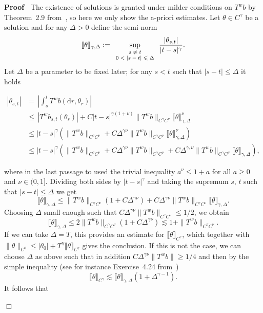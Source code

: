 \documentclass[10pt]{article}
\newcommand{\assign}{:=}
\newcommand{\mathd}{\mathrm{d}}
\newcommand{\tmscript}[1]{\text{\scriptsize{$#1$}}}
\newenvironment{proof}{\noindent\textbf{Proof\ }}{\hspace*{\fill}$\Box$\medskip}
\begin{document}
\begin{proof}
  The existence of solutions is granted under milder conditions on $T^w b$ by
  Theorem~2.9 from~{\cite{catelliergubinelli}}, so here we only show the
  a-priori estimates. Let $\theta \in C^{\gamma}$ be a solution and for any
  $\Delta > 0$ define the semi-norm
  \[ \llbracket \theta \rrbracket_{\gamma, \Delta} \assign
     \sup_{\tmscript{\begin{array}{c}
       s \neq t\\
       0 < | s - t | \leqslant \Delta
     \end{array}}} \frac{| \theta_{s, t} |}{| t - s |^{\gamma}} . \]
  Let $\Delta$ be a parameter to be fixed later; for any $s < t$ such that $|
  s - t | \leqslant \Delta$ it holds
  
  \begin{align*}
    | \theta_{s, t} | & = \, \left| \int_s^t T^w b (\mathd r, \theta_r)
    \right|\\
    & \leqslant \, | T^w b_{s, t} (\theta_s) | + C | t - s |^{\gamma (1 +
    \nu)}  \| T^w b \|_{C^{\gamma} C^{\nu}}  \llbracket \theta
    \rrbracket^{\nu}_{\gamma, \Delta}\\
    & \leqslant | t - s |^{\gamma}  (\| T^w b \|_{C^{\gamma} C^{\nu}} + C
    \Delta^{\gamma \nu} \| T^w b \|_{C^{\gamma} C^{\nu}}  \llbracket \theta
    \rrbracket^{\nu}_{\gamma, \Delta})\\
    & \leqslant | t - s |^{\gamma} (\| T^w b \|_{C^{\gamma} C^{\nu}} + C
    \Delta^{\gamma \nu} \| T^w b \|_{C^{\gamma} C^{\nu}} + C
    \Delta^{\gamma, \nu} \| T^w b \|_{C^{\gamma} C^{\nu}} \llbracket \theta
    \rrbracket_{\gamma, \Delta}),
  \end{align*}
  
  where in the last passage to used the trivial inequality $a^{\nu} \leqslant
  1 + a$ for all $a \geqslant 0$ and $\nu \in (0, 1]$. Dividing both sides by
  $| t - s |^{\gamma}$ and taking the supremum $s$, $t$ such that $| s - t |
  \leqslant \Delta$ we get
  \[ \llbracket \theta \rrbracket_{\gamma, \Delta} \leqslant \| T^w b
     \|_{C^{\gamma} C^{\nu}}  (1 + C \Delta^{\gamma \nu}) + C \Delta^{\gamma
     \nu} \| T^w b \|_{C^{\gamma} C^{\nu}} \llbracket \theta
     \rrbracket_{\gamma, \Delta} . \]
  Choosing $\Delta$ small enough such that $C \Delta^{\gamma \nu} \| T^w b
  \|_{C^{\gamma} C^{\nu}} \leqslant 1 / 2$, we obtain
  \[ \llbracket \theta \rrbracket_{\gamma, \Delta} \leqslant 2 \| T^w b
     \|_{C^{\gamma} C^{\nu}}  (1 + C \Delta^{\gamma \nu}) \lesssim 1 + \| T^w
     b \|_{C^{\gamma} C^{\nu}} . \]
  If we can take $\Delta = T$, this provides an estimate for $\llbracket
  \theta \rrbracket_{C^{\gamma}}$, which together with $\| \theta \|_{C^0}
  \leqslant | \theta_0 | + T^{\gamma} \llbracket \theta
  \rrbracket_{C^{\gamma}}$ gives the conclusion. If this is not the case, we
  can choose $\Delta$ as above such that in addition $C \Delta^{\gamma \nu} \|
  T^w b \| \geqslant 1 / 4$ and then by the simple inequality (see for
  instance Exercise~4.24 from~{\cite{frizhairer}})
  \[ \llbracket \theta \rrbracket_{C^{\gamma}} \lesssim \llbracket \theta
     \rrbracket_{\gamma, \Delta} (1 + \Delta^{\gamma - 1}) . \]
  It follows that
  

\end{proof}
\end{document}
